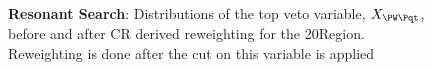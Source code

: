 {	\begin{figure}[ht]
	    \centering
	    \caption{\textbf{Resonant Search}: Distributions of the top veto variable, $X_{\PW\Pqt}$, before and after CR derived reweighting for the 20\yr\space \region\space Region. Reweighting is done after the cut on this variable is applied
	    \label{fig:res-\region\yr-8}}
	\end{figure}
}
